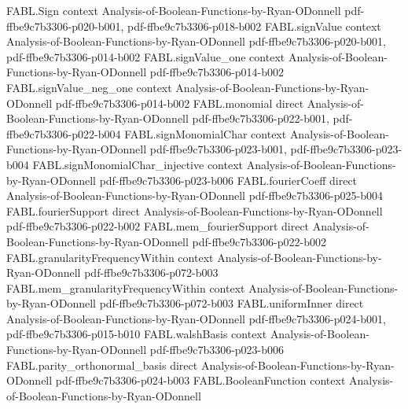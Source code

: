 \begin{theorem}
\label{FABL.hasSmallStableInfluences_iff_equation_7_5}
\leanok
{}
\proofstep
  {FABL.Sign}
  {context}
  {Analysis-of-Boolean-Functions-by-Ryan-ODonnell}
  {pdf-ffbe9c7b3306-p020-b001,
    pdf-ffbe9c7b3306-p018-b002}
\proofstep
  {FABL.signValue}
  {context}
  {Analysis-of-Boolean-Functions-by-Ryan-ODonnell}
  {pdf-ffbe9c7b3306-p020-b001,
    pdf-ffbe9c7b3306-p014-b002}
\proofstep
  {FABL.signValue_one}
  {context}
  {Analysis-of-Boolean-Functions-by-Ryan-ODonnell}
  {pdf-ffbe9c7b3306-p014-b002}
\proofstep
  {FABL.signValue_neg_one}
  {context}
  {Analysis-of-Boolean-Functions-by-Ryan-ODonnell}
  {pdf-ffbe9c7b3306-p014-b002}
\proofstep
  {FABL.monomial}
  {direct}
  {Analysis-of-Boolean-Functions-by-Ryan-ODonnell}
  {pdf-ffbe9c7b3306-p022-b001,
    pdf-ffbe9c7b3306-p022-b004}
\proofstep
  {FABL.signMonomialChar}
  {context}
  {Analysis-of-Boolean-Functions-by-Ryan-ODonnell}
  {pdf-ffbe9c7b3306-p023-b001,
    pdf-ffbe9c7b3306-p023-b004}
\proofstep
  {FABL.signMonomialChar_injective}
  {context}
  {Analysis-of-Boolean-Functions-by-Ryan-ODonnell}
  {pdf-ffbe9c7b3306-p023-b006}
\proofstep
  {FABL.fourierCoeff}
  {direct}
  {Analysis-of-Boolean-Functions-by-Ryan-ODonnell}
  {pdf-ffbe9c7b3306-p025-b004}
\proofstep
  {FABL.fourierSupport}
  {direct}
  {Analysis-of-Boolean-Functions-by-Ryan-ODonnell}
  {pdf-ffbe9c7b3306-p022-b002}
\proofstep
  {FABL.mem_fourierSupport}
  {direct}
  {Analysis-of-Boolean-Functions-by-Ryan-ODonnell}
  {pdf-ffbe9c7b3306-p022-b002}
\proofstep
  {FABL.granularityFrequencyWithin}
  {context}
  {Analysis-of-Boolean-Functions-by-Ryan-ODonnell}
  {pdf-ffbe9c7b3306-p072-b003}
\proofstep
  {FABL.mem_granularityFrequencyWithin}
  {context}
  {Analysis-of-Boolean-Functions-by-Ryan-ODonnell}
  {pdf-ffbe9c7b3306-p072-b003}
\proofstep
  {FABL.uniformInner}
  {direct}
  {Analysis-of-Boolean-Functions-by-Ryan-ODonnell}
  {pdf-ffbe9c7b3306-p024-b001,
    pdf-ffbe9c7b3306-p015-b010}
\proofstep
  {FABL.walshBasis}
  {context}
  {Analysis-of-Boolean-Functions-by-Ryan-ODonnell}
  {pdf-ffbe9c7b3306-p023-b006}
\proofstep
  {FABL.parity_orthonormal_basis}
  {direct}
  {Analysis-of-Boolean-Functions-by-Ryan-ODonnell}
  {pdf-ffbe9c7b3306-p024-b003}
\proofstep
  {FABL.BooleanFunction}
  {context}
  {Analysis-of-Boolean-Functions-by-Ryan-ODonnell}

\end{theorem}
